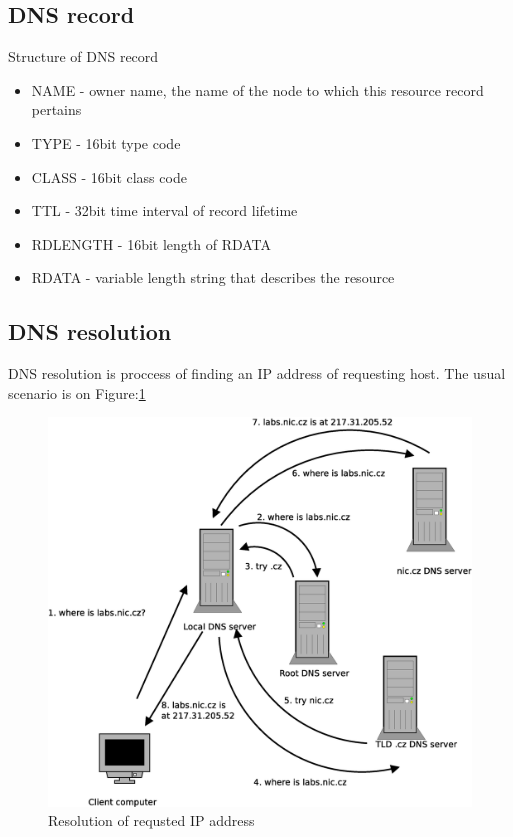 \documentclass[thesis=M,english]{FITthesis}[2012/10/20]
\begin{document}
\subsection{DNS record}
Structure of DNS record \cite{Moc87a}

\begin{itemize}
\item NAME - owner name, the name of the node to which this resource record pertains
\item TYPE - 16bit type code
\item CLASS - 16bit class code
\item TTL - 32bit time interval of record lifetime
\item RDLENGTH - 16bit length of RDATA
\item RDATA - variable length string that describes the resource
\end{itemize}

\subsection{DNS resolution}
DNS resolution is proccess of finding an IP address of requesting host. The usual scenario is on Figure:\ref{fig:dns_res}

\begin{figure}[h]
  \centering
  \includegraphics[width=15cm]{./img/dns_resolution}
  \caption{Resolution of requsted IP address}
  \label{fig:dns_res}
\end{figure}
\end{document}
